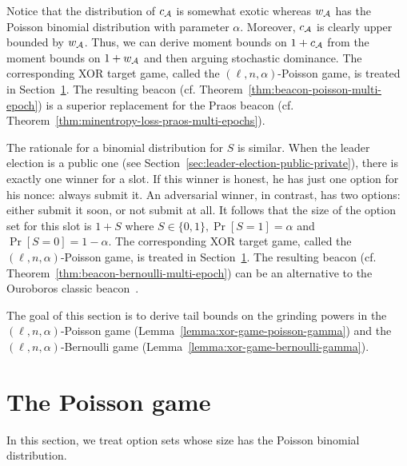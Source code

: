 Notice that the distribution of $c_{\mathcal{A}}$ is somewhat exotic 
whereas $w_{\mathcal{A}}$ has the Poisson binomial distribution with parameter $\alpha$.
Moreover, $c_{\mathcal{A}}$ is clearly upper bounded by $w_{\mathcal{A}}$. 
Thus, we can derive moment bounds on $1 + c_{\mathcal{A}}$ from 
the moment bounds on $1 + w_{\mathcal{A}}$ 
and then arguing stochastic dominance.
The corresponding XOR target game, called the $(\ell, n, \alpha)$-Poisson game, 
is treated in Section~\ref{sec:poisson}. 
The resulting beacon (cf. Theorem~\ref{thm:beacon-poisson-multi-epoch}) 
is a superior replacement for the Praos beacon (cf. Theorem~\ref{thm:minentropy-loss-praos-multi-epochs}).


The rationale for a binomial distribution for $S$ is similar.
When the leader election is a public one (see Section~\ref{sec:leader-election-public-private}), 
there is exactly one winner for a slot. 
If this winner is honest, he has just one option for his nonce: always submit it.
An adversarial winner, in contrast, has two options: 
either submit it soon, or not submit at all. 
It follows that the size of the option set for this slot is $1+S$ where 
$S \in \{0,1\}, \Pr[S = 1] = \alpha$ and $\Pr[S = 0] = 1 - \alpha$.
The corresponding XOR target game, called the $(\ell, n, \alpha)$-Poisson game, 
is treated in Section~\ref{sec:poisson}.
The resulting beacon (cf. Theorem~\ref{thm:beacon-bernoulli-multi-epoch}) 
can be an alternative to the Ouroboros classic beacon~\cite{Ouroboros}.


The goal of this section is to derive tail bounds on 
the grinding powers in the $(\ell,n,\alpha)$-Poisson game 
(Lemma~\ref{lemma:xor-game-poisson-gamma})
and the $(\ell, n, \alpha)$-Bernoulli game 
(Lemma~\ref{lemma:xor-game-bernoulli-gamma}).






%

\section{The Poisson game}\label{sec:poisson}

  In this section, 
  we treat option sets whose size has the Poisson binomial distribution.


